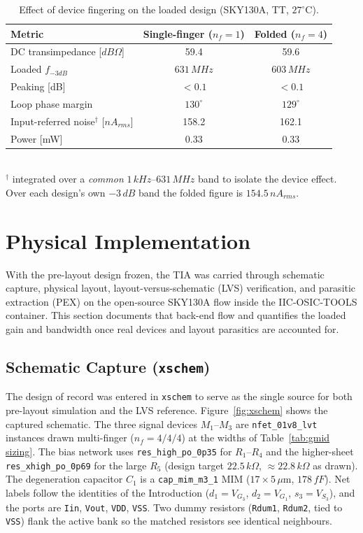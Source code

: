 \documentclass{article}
\begin{document}
\begin{table}[H]
    \centering
    \caption{Effect of device fingering on the loaded design (SKY130A, TT, $27^\circ$C).}
    \label{tab:fingering}
    \begin{tabular}{l|c|c} \hline
        \textbf{Metric} & \textbf{Single-finger ($n_f{=}1$)} & \textbf{Folded ($n_f{=}4$)} \\ \hline
        DC transimpedance [$dB\Omega$]      & 59.4  & 59.6  \\ \hline
        Loaded $f_{-3dB}$                   & $631\,MHz$ & $603\,MHz$ \\ \hline
        Peaking [dB]                        & $<0.1$ & $<0.1$ \\ \hline
        Loop phase margin                   & $130^\circ$ & $129^\circ$ \\ \hline
        Input-referred noise$^\dagger$ [$nA_{rms}$] & 158.2 & 162.1 \\ \hline
        Power [mW]                          & 0.33  & 0.33  \\ \hline
    \end{tabular}
    \\[2pt]
    {\footnotesize $^\dagger$ integrated over a \emph{common} $1\,kHz$--$631\,MHz$ band to isolate
    the device effect. Over each design's own $-3\,dB$ band the folded figure is $154.5\,nA_{rms}$.}
\end{table}

\section{Physical Implementation}
\label{sec:physical}
With the pre-layout design frozen, the TIA was carried through schematic capture, physical
layout, layout-versus-schematic (LVS) verification, and parasitic extraction (PEX) on the
open-source SKY130A flow inside the IIC-OSIC-TOOLS container. This section documents that
back-end flow and quantifies the loaded gain and bandwidth once real devices and layout
parasitics are accounted for.

\subsection{Schematic Capture (\texttt{xschem})}
\label{sec:xschem}
The design of record was entered in \texttt{xschem} to serve as the single source for both
pre-layout simulation and the LVS reference. Figure~\ref{fig:xschem} shows the captured
schematic. The three signal devices $M_1$--$M_3$ are \texttt{nfet\_01v8\_lvt} instances drawn
multi-finger ($n_f=4/4/4$) at the widths of Table~\ref{tab:gmid sizing}. The bias network uses
\texttt{res\_high\_po\_0p35} for $R_1$--$R_4$ and the higher-sheet \texttt{res\_xhigh\_po\_0p69}
for the large $R_5$ (design target $22.5\,k\Omega$, $\approx22.8\,k\Omega$ as drawn). The degeneration capacitor $C_1$ is a
\texttt{cap\_mim\_m3\_1} MIM ($17\times5\,\mu$m, $178\,fF$). Net labels follow the identities of
the Introduction ($d_1=V_{G_3}$, $d_2=V_{G_1}$, $s_3=V_{S_3}$), and the ports are \texttt{Iin},
\texttt{Vout}, \texttt{VDD}, \texttt{VSS}. Two dummy resistors (\texttt{Rdum1}, \texttt{Rdum2},
tied to \texttt{VSS}) flank the active bank so the matched resistors see identical neighbours.
\end{document}
